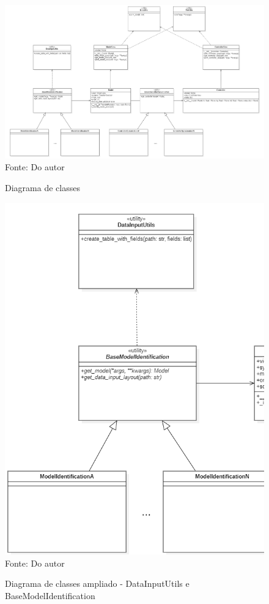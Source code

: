\begin{figure}[H]
    \centering
    \caption{Diagrama de classes}
    \includegraphics[scale=0.32]{figuras/class_diag}
    \label{fig:class_diag}
    \\
    \vspace{0cm}\hspace{0cm}\small{Fonte: Do autor}
\end{figure}

\begin{figure}[H]
    \centering
    \caption{Diagrama de classes ampliado - DataInputUtils e BaseModelIdentification}
    \includegraphics[scale=0.6]{figuras/class_diag_diubmi}
    \label{fig:class_diag_diubmi}
    \\
    \vspace{0cm}\hspace{0cm}\small{Fonte: Do autor}
\end{figure}

